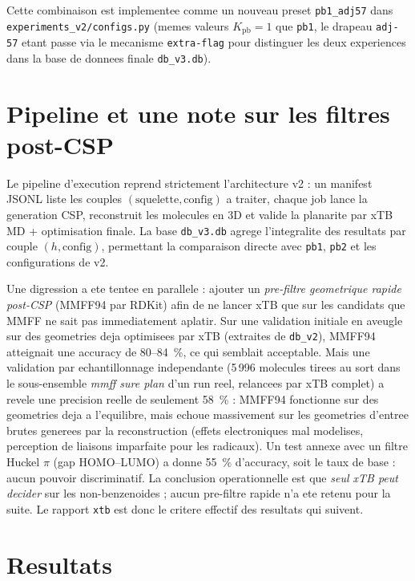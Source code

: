 \documentclass[11pt,a4paper]{article}
\begin{document}
Cette combinaison est implementee comme un nouveau preset
\texttt{pb1\_adj57} dans \texttt{experiments\_v2/configs.py} (memes
valeurs $K_{\text{pb}} = 1$ que \texttt{pb1}, le drapeau \texttt{adj-57}
etant passe via le mecanisme \texttt{extra-flag} pour distinguer les
deux experiences dans la base de donnees finale \texttt{db\_v3.db}).

\section{Pipeline et une note sur les filtres post-CSP}

Le pipeline d'execution reprend strictement l'architecture v2 : un
manifest JSONL liste les couples $(\text{squelette}, \text{config})$ a
traiter, chaque job lance la generation CSP, reconstruit les molecules
en 3D et valide la planarite par xTB MD + optimisation finale. La base
\texttt{db\_v3.db} agrege l'integralite des resultats par couple
$(h, \text{config})$, permettant la comparaison directe avec
\texttt{pb1}, \texttt{pb2} et les configurations de v2.

Une digression a ete tentee en parallele : ajouter un \emph{pre-filtre
geometrique rapide post-CSP} (MMFF94 par RDKit) afin de ne lancer xTB
que sur les candidats que MMFF ne sait pas immediatement aplatir. Sur
une validation initiale en aveugle sur des geometries deja optimisees
par xTB (extraites de \texttt{db\_v2}), MMFF94 atteignait une accuracy
de 80--84~\%, ce qui semblait acceptable. Mais une validation par
echantillonnage independante (5\,996 molecules tirees au sort dans le
sous-ensemble \emph{mmff sure plan} d'un run reel, relancees par xTB
complet) a revele une precision reelle de seulement 58~\% : MMFF94
fonctionne sur des geometries deja a l'equilibre, mais echoue
massivement sur les geometries d'entree brutes generees par la
reconstruction (effets electroniques mal modelises, perception de
liaisons imparfaite pour les radicaux). Un test annexe avec un filtre
Huckel $\pi$ (gap HOMO--LUMO) a donne 55~\% d'accuracy, soit le taux de
base : aucun pouvoir discriminatif. La conclusion operationnelle est
que \emph{seul xTB peut decider} sur les non-benzenoides ; aucun
pre-filtre rapide n'a ete retenu pour la suite. Le rapport \texttt{xtb}
est donc le critere effectif des resultats qui suivent.

\section{Resultats}
\end{document}
